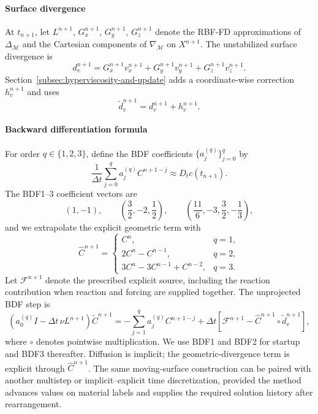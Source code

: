 \documentclass[a4paper,fleqn]{cas-sc}
\begin{document}
\paragraph{Surface divergence}
At $t_{n+1}$, let $
  L^{n+1}$, $G_x^{n+1}$, $G_y^{n+1}$, $G_z^{n+1}$
denote the RBF-FD approximations of $\Delta_{\mathcal M}$ and the Cartesian
components of $\nabla_{\mathcal M}$ on $X^{n+1}$.  The unstabilized surface
divergence is
\begin{equation}
  d_v^{n+1}
  =
  G_x^{n+1}v_x^{n+1}
  +G_y^{n+1}v_y^{n+1}
  +G_z^{n+1}v_z^{n+1}.
  \label{eq:discrete-surface-divergence}
\end{equation}
Section~\ref{subsec:hyperviscosity-and-update} adds a coordinate-wise
correction $h_v^{n+1}$ and uses
\begin{equation}
  \widetilde d_v^{n+1}=d_v^{n+1}+h_v^{n+1}.
  \label{eq:stabilized-surface-divergence}
\end{equation}

\paragraph{Backward differentiation formula}
For order $q\in\{1,2,3\}$, define the BDF coefficients
$\{a_j^{(q)}\}_{j=0}^q$ by
\[
  \frac{1}{\Delta t}\sum_{j=0}^q a_j^{(q)}C^{n+1-j}
  \approx D_t c(t_{n+1}).
\]
The BDF1--3 coefficient vectors are
\[
  (1,-1),\qquad
  \left(\frac32,-2,\frac12\right),\qquad
  \left(\frac{11}{6},-3,\frac32,-\frac13\right),
\]
and we extrapolate the explicit geometric term with
\[
  \widehat C^{n+1}
  =
  \begin{cases}
    C^n, & q=1,\\
    2C^n-C^{n-1}, & q=2,\\
    3C^n-3C^{n-1}+C^{n-2}, & q=3.
  \end{cases}
\]
Let $\mathcal F^{n+1}$ denote the prescribed explicit source, including the
reaction contribution when reaction and forcing are supplied together.  The
unprojected BDF step is
\begin{equation}
  \left(a_0^{(q)}I-\Delta t\,\nu L^{n+1}\right)\widetilde C^{n+1}
  =
  -\sum_{j=1}^q a_j^{(q)}C^{n+1-j}
  +\Delta t\left[
    \mathcal F^{n+1}
    -\widehat C^{n+1}\circ\widetilde d_v^{n+1}
  \right],
  \label{eq:bdf-update}
\end{equation}
where $\circ$ denotes pointwise multiplication.  We use BDF1 and BDF2 for
startup and BDF3 thereafter.  Diffusion is implicit; the geometric-divergence
term is explicit through $\widehat C^{n+1}$.  The same moving-surface construction can be paired with another multistep or
implicit--explicit time discretization, provided the method advances values on
material labels and supplies the required solution history after
rearrangement.
\end{document}
